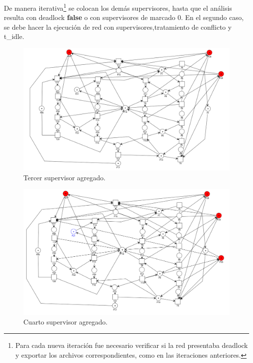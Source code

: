 De manera iterativa\footnote{Para cada nueva iteración fue necesario verificar si la red presentaba deadlock y exportar los archivos correspondientes, como en las iteraciones anteriores.} se colocan los demás supervisores, hasta que el análisis resulta con deadlock \textbf{false} o con supervisores de marcado 0. En el segundo caso, se debe hacer la ejecución de red con supervisores,tratamiento de conflicto y t\_idle.

\begin{figure} [H]
    \centering
    \includegraphics[width=\textwidth]{Figures/apendiceB/supervisor3.png}
    \caption{Tercer supervisor agregado.}
    \label{fig:b-supervisor3}
\end{figure}
\bigskip

\begin{figure} [H]
    \centering
    \includegraphics[width=\textwidth]{Figures/apendiceB/supervisor4.png}
    \caption{Cuarto supervisor agregado.}
    \label{fig:b-supervisor4}
\end{figure}

